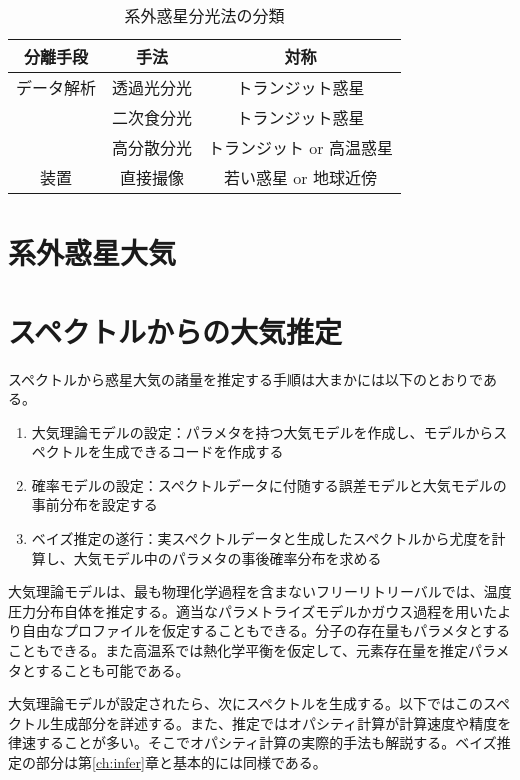 \documentclass[xelatex,a4paper, twocolumn]{bxjsreport}
\begin{document}
\begin{table}[htbp]
\footnotesize
  \centering
  \caption{系外惑星分光法の分類}
  \label{tab:light_sep}
  \begin{tabular}{ccc}
    \hline
    分離手段 & 手法 & 対称 \\
    \hline
    データ解析 & 透過光分光 & トランジット惑星 \\
     & 二次食分光 & トランジット惑星 \\
     & 高分散分光 & トランジット or 高温惑星 \\
    \hline
    装置 & 直接撮像 & 若い惑星 or 地球近傍\\
    \hline
  \end{tabular}
\end{table}








\chapter{系外惑星大気}





\chapter{スペクトルからの大気推定}

スペクトルから惑星大気の諸量を推定する手順は大まかには以下のとおりである。
\begin{enumerate}
    \item 大気理論モデルの設定：パラメタを持つ大気モデルを作成し、モデルからスペクトルを生成できるコードを作成する
    \item 確率モデルの設定：スペクトルデータに付随する誤差モデルと大気モデルの事前分布を設定する 
    \item ベイズ推定の遂行：実スペクトルデータと生成したスペクトルから尤度を計算し、大気モデル中のパラメタの事後確率分布を求める
\end{enumerate}

大気理論モデルは、最も物理化学過程を含まないフリーリトリーバルでは、温度圧力分布自体を推定する。適当なパラメトライズモデルかガウス過程を用いたより自由なプロファイルを仮定することもできる。分子の存在量もパラメタとすることもできる。また高温系では熱化学平衡を仮定して、元素存在量を推定パラメタとすることも可能である。

大気理論モデルが設定されたら、次にスペクトルを生成する。以下ではこのスペクトル生成部分を詳述する。また、推定ではオパシティ計算が計算速度や精度を律速することが多い。そこでオパシティ計算の実際的手法も解説する。ベイズ推定の部分は第\ref{ch:infer}章と基本的には同様である。
\end{document}
